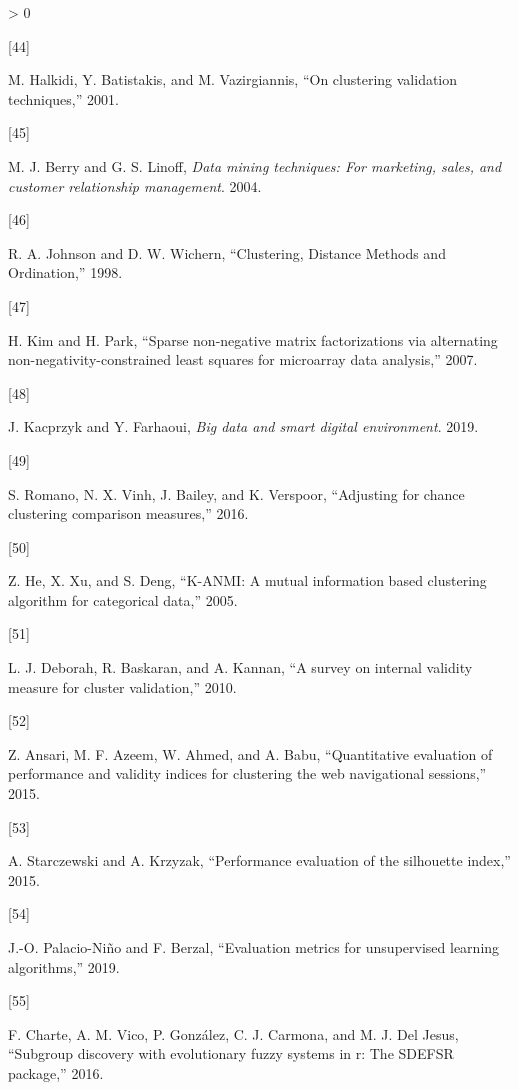 \documentclass[
]{article}
\newlength{\cslhangindent}
\newlength{\csllabelwidth}
\newenvironment{CSLReferences}[3] %
 {%
  \setlength{\parindent}{0pt}
  \ifodd #1 \everypar{\setlength{\hangindent}{\cslhangindent}}\ignorespaces\fi
  \ifnum #2 > 0
  \setlength{\parskip}{#2\baselineskip}
  \fi
 }%
 {}
\newcommand{\CSLLeftMargin}[1]{\parbox[t]{\csllabelwidth}{#1}}
\newcommand{\CSLRightInline}[1]{\parbox[t]{\linewidth - \csllabelwidth}{#1}}
\begin{document}
\begin{CSLReferences}{0}{0}
\leavevmode\hypertarget{ref-b53}{}%
\CSLLeftMargin{{[}44{]} }
\CSLRightInline{M. Halkidi, Y. Batistakis, and M. Vazirgiannis, {``On
clustering validation techniques,''} 2001.}

\leavevmode\hypertarget{ref-b52}{}%
\CSLLeftMargin{{[}45{]} }
\CSLRightInline{M. J. Berry and G. S. Linoff, \emph{Data mining
techniques: For marketing, sales, and customer relationship management}.
2004.}

\leavevmode\hypertarget{ref-b60}{}%
\CSLLeftMargin{{[}46{]} }
\CSLRightInline{R. A. Johnson and D. W. Wichern, {``{Clustering,
Distance Methods and Ordination},''} 1998.}

\leavevmode\hypertarget{ref-b40}{}%
\CSLLeftMargin{{[}47{]} }
\CSLRightInline{H. Kim and H. Park, {``{Sparse non-negative matrix
factorizations via alternating non-negativity-constrained least squares
for microarray data analysis},''} 2007.}

\leavevmode\hypertarget{ref-b41}{}%
\CSLLeftMargin{{[}48{]} }
\CSLRightInline{J. Kacprzyk and Y. Farhaoui, \emph{Big data and smart
digital environment}. 2019.}

\leavevmode\hypertarget{ref-b43}{}%
\CSLLeftMargin{{[}49{]} }
\CSLRightInline{S. Romano, N. X. Vinh, J. Bailey, and K. Verspoor,
{``{Adjusting for chance clustering comparison measures},''} 2016.}

\leavevmode\hypertarget{ref-b63}{}%
\CSLLeftMargin{{[}50{]} }
\CSLRightInline{Z. He, X. Xu, and S. Deng, {``{K-ANMI:} {A} mutual
information based clustering algorithm for categorical data,''} 2005.}

\leavevmode\hypertarget{ref-b39}{}%
\CSLLeftMargin{{[}51{]} }
\CSLRightInline{L. J. Deborah, R. Baskaran, and A. Kannan, {``A survey
on internal validity measure for cluster validation,''} 2010.}

\leavevmode\hypertarget{ref-b44}{}%
\CSLLeftMargin{{[}52{]} }
\CSLRightInline{Z. Ansari, M. F. Azeem, W. Ahmed, and A. Babu,
{``Quantitative evaluation of performance and validity indices for
clustering the web navigational sessions,''} 2015.}

\leavevmode\hypertarget{ref-b45}{}%
\CSLLeftMargin{{[}53{]} }
\CSLRightInline{A. Starczewski and A. Krzyzak, {``Performance evaluation
of the silhouette index,''} 2015.}

\leavevmode\hypertarget{ref-b54}{}%
\CSLLeftMargin{{[}54{]} }
\CSLRightInline{J.-O. Palacio-Niño and F. Berzal, {``Evaluation metrics
for unsupervised learning algorithms,''} 2019.}

\leavevmode\hypertarget{ref-b55}{}%
\CSLLeftMargin{{[}55{]} }
\CSLRightInline{F. Charte, A. M. Vico, P. González, C. J. Carmona, and
M. J. Del Jesus, {``Subgroup discovery with evolutionary fuzzy systems
in r: The SDEFSR package,''} 2016.}

\end{CSLReferences}
\end{document}
